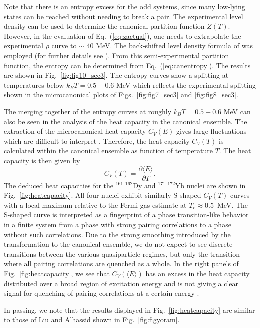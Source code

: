 \documentclass[rmp,aps,floatfix]{revtex4}
\begin{document}
Note that there is an entropy excess 
for the odd systems, since many low-lying
states can be reached without needing to break a pair.
The experimental level density can be used to determine the canonical 
partition function $Z(T)$. However, in the evaluation of 
Eq.\ (\ref{eq:zactual}), one needs  to extrapolate the 
experimental $\rho$ curve to $\sim$ 40 MeV. The 
back-shifted level density formula of \cite{back_shift,esb88} 
was employed (for further details see \cite{andreas2000}).
From this semi-experimental partition function, the 
entropy can be determined from Eq.\ (\ref{eq:canentropy}). The results 
are shown in Fig.\ \ref{fig:fig10_sec3}. The entropy curves show 
a splitting at temperatures below  $k_BT = 0.5 - 0.6$ MeV 
which reflects the experimental splitting shown in the microcanonical 
plots of Figs.~\ref{fig:fig7_sec3}  and \ref{fig:fig8_sec3}. 


The merging together of the entropy curves at roughly
$k_BT = 0.5 - 0.6$ MeV can also be seen in the analysis of the 
heat capacity in the canonical ensemble.  
The extraction of the microcanonical heat capacity $C_V(E)$ gives large 
fluctuations which are difficult to interpret \cite{oslo3}. Therefore, the heat 
capacity $C_V(T)$ is calculated within the canonical ensemble as function of
temperature $T$. The heat 
capacity is then given by 
\begin{equation}
C_V(T)=\frac{\partial\langle E\rangle}{\partial T}.
\end{equation}
The deduced heat capacities for the $^{161,162}$Dy and $^{171,172}$Yb nuclei 
are shown in Fig.~\ref{fig:heatcapacity}. All four nuclei exhibit similarly 
S-shaped $C_V(T)$-curves with a local maximum relative to the Fermi gas 
estimate at $T_c\approx 0.5$~MeV. The S-shaped curve is interpreted as a 
fingerprint of a phase transition-like behavior in a 
finite system from a phase with strong 
pairing correlations to a phase without such correlations. Due to the strong 
smoothing introduced by the transformation to the canonical ensemble, we do not
expect to see discrete transitions between the various quasiparticle regimes, 
but only the transition where all pairing correlations are quenched as a whole.
In the right panels of Fig.~\ref{fig:heatcapacity}, we see that 
$C_V(\langle E\rangle)$ has an excess in the heat capacity distributed over 
a broad region of excitation energy and is not giving a clear signal for 
quenching of pairing correlations at a certain energy \cite{oslo3}. 


In passing, we note that the results displayed in Fig.~\ref{fig:heatcapacity}
are similar to those of Liu and Alhassid \cite{liu01} 
shown in Fig.~\ref{fig:figyoram}.
\end{document}
